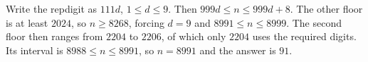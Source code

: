 Write the repdigit as $111d$, $1\le d\le9$. Then $999d\le n\le999d+8$. The other floor is at least $2024$, so $n\ge8268$, forcing $d=9$ and $8991\le n\le8999$. The second floor then ranges from $2204$ to $2206$, of which only $2204$ uses the required digits. Its interval is $8988\le n\le8991$, so $n=8991$ and the answer is $\boxed{91}$.
